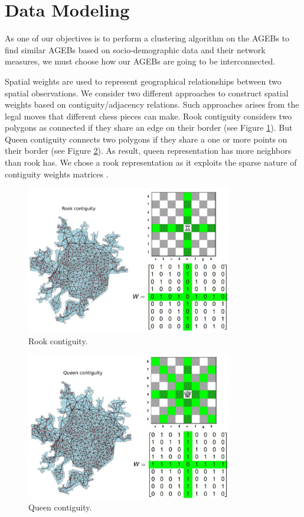 \section{Data Modeling}

As one of our objectives is to perform a clustering algorithm on the AGEBs to find similar AGEBs based on socio-demographic data and their network measures, we must choose how our AGEBs are going to be interconnected.

Spatial weights are used to represent geographical relationships between two spatial observations. We consider two different approaches to construct spatial weights based on contiguity/adjacency relations. Such approaches arises from the legal moves that different chess pieces can make. Rook contiguity considers two polygons as connected if they share an edge on their border (see Figure \ref{fig:rook-contiguity}). But Queen contiguity connects two polygons if they share a one or more points on their border (see Figure \ref{fig:queen-contiguity}). As result, queen representation has more neighbors than rook has. We chose a rook representation as it exploits the sparse nature of contiguity weights matrices \cite{rey_geo_ds_2020}.

\begin{figure}[h!]
	\centering
	\includegraphics[width=0.8\textwidth]{Figures/rook-contiguity.jpg}
	\caption{Rook contiguity.
		\label{fig:rook-contiguity}}
\end{figure}

\begin{figure}[h!]
	\centering
	\includegraphics[width=0.8\textwidth]{Figures/queen-contiguity.jpg}
	\caption{Queen contiguity.
		\label{fig:queen-contiguity}}
\end{figure}

